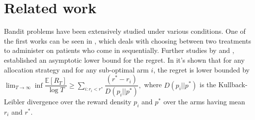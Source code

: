 

\section*{Related work}

\par Bandit problems have been extensively studied under various conditions. One of the first works can be seen in \cite{thompson1933likelihood}, which deals with choosing between two treatments to administer on patients who come in sequentially. Further studies by \cite{robbins1952some} and \cite{lai1985asymptotically}, established an asymptotic lower bound for the regret. In \cite{lai1985asymptotically} it's shown that for any allocation strategy and for any sub-optimal arm $i$, the regret is lower bounded by 
$\lim_{T\rightarrow\infty} \inf\dfrac{\mathbb{E}[R_{T}]}{\log T}\geq\sum_{i:r_{i}<r^{*}}\dfrac{(r^{*}-r_{i})}{D(p_{i}||p^{*})},$
where $D(p_{i}||p^{*})$ is the Kullback-Leibler divergence over the reward density $p_{i}$ and $p^{*}$ over the arms having mean $r_{i}$ and $r^{*}$.

